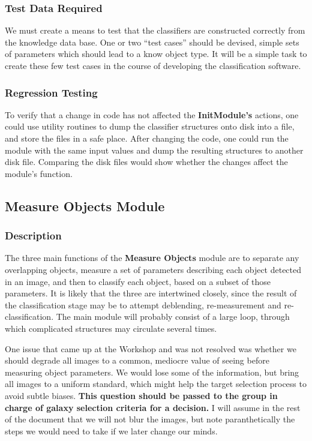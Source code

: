 \subsubsection {Test Data Required}

  We must create a means to test that the classifiers are
constructed correctly from the knowledge data base.  One
or two ``test cases'' should be devised, simple sets of
parameters which should lead to a know object type.
It will be a simple task to create these few test cases
in the course of developing the classification software.

\subsubsection {Regression Testing}

  To verify that a change in code has not affected the
{\bf InitModule's} actions, one could use utility routines
to dump the classifier structures onto disk into a file,
and store the files in a safe place.  After changing the code,
one could 
run the module with the same input values and dump
the resulting structures to another disk file.  
Comparing the disk files would show whether the changes
affect the module's function.
  
\subsection {Measure Objects Module}

\subsubsection {Description}

  The three main functions of the {\bf Measure Objects} module
are to separate any overlapping objects,
measure a set of parameters describing each object
detected in an image, and then to classify each object, based
on a subset of those parameters.  
It is likely that the three are intertwined closely,
since the result of the classification stage may be to
attempt deblending, re-measurement and re-classification.
The main module will probably
consist of a large loop, through which complicated structures
may circulate several times.

  One issue that came up at the Workshop and was not resolved
was whether we should degrade all images to a common, mediocre
value of seeing before measuring object parameters.  
We would lose some of the information, but bring all images
to a uniform standard, which might help the target selection process
to avoid subtle biases.  
{\bf This question should be passed to the group in charge of galaxy 
selection criteria for a decision.}
I will assume in the rest of the document that we will not
blur the images, but note paranthetically the steps we would 
need to take if we later change our minds.

